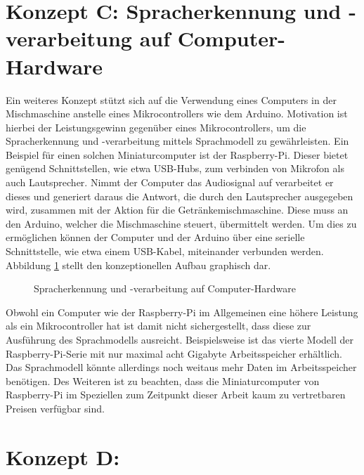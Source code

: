\section{Konzept C: Spracherkennung und -verarbeitung auf Computer-Hardware}
Ein weiteres Konzept stützt sich auf die Verwendung eines Computers in der Mischmaschine anstelle eines Mikrocontrollers wie dem Arduino.
Motivation ist hierbei der Leistungsgewinn gegenüber eines Mikrocontrollers, um die Spracherkennung und -verarbeitung mittels Sprachmodell zu gewährleisten.
Ein Beispiel für einen solchen Miniaturcomputer ist der Raspberry-Pi.
Dieser bietet genügend Schnittstellen, wie etwa USB-Hubs, zum verbinden von Mikrofon als auch Lautsprecher.
Nimmt der Computer das Audiosignal auf verarbeitet er dieses und generiert daraus die Antwort, die durch den Lautsprecher ausgegeben wird, zusammen mit der Aktion für die Getränkemischmaschine.
Diese muss an den Arduino, welcher die Mischmaschine steuert, übermittelt werden.
Um dies zu ermöglichen können der Computer und der Arduino über eine serielle Schnittstelle, wie etwa einem USB-Kabel, miteinander  verbunden werden.
Abbildung \ref{figure:Konzept_Raspberry} stellt den konzeptionellen Aufbau graphisch dar.
\begin{figure}[H]
    \centering
    \caption{\label{figure:Konzept_Raspberry}Spracherkennung und -verarbeitung auf Computer-Hardware}
\end{figure}
\noindent
Obwohl ein Computer wie der Raspberry-Pi im Allgemeinen eine höhere Leistung als ein Mikrocontroller hat ist damit nicht sichergestellt, dass diese zur Ausführung des Sprachmodells ausreicht.
Beispielsweise ist das vierte Modell der Raspberry-Pi-Serie mit nur maximal acht Gigabyte Arbeitsspeicher erhältlich.
Das Sprachmodell könnte allerdings noch weitaus mehr Daten im Arbeitsspeicher benötigen.
Des Weiteren ist zu beachten, dass die Miniaturcomputer von Raspberry-Pi im Speziellen zum Zeitpunkt dieser Arbeit kaum zu vertretbaren Preisen verfügbar sind.
\section{Konzept D:}
